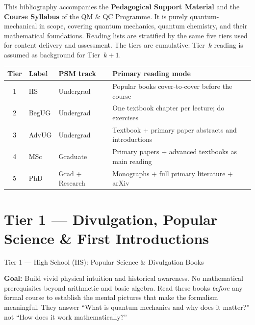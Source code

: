 \documentclass[11pt,a4paper]{article}
\begin{document}
\begin{tcolorbox}[keybox]
This bibliography accompanies the \textbf{Pedagogical Support Material} and the
\textbf{Course Syllabus} of the QM \& QC Programme. It is purely quantum-mechanical
in scope, covering quantum mechanics, quantum chemistry, and their mathematical
foundations. Reading lists are stratified by the same five tiers used for content
delivery and assessment. The tiers are cumulative: Tier~$k$ reading is assumed as
background for Tier~$k+1$.
\end{tcolorbox}

\begin{center}
\begin{tabular}{clp{3.2cm}p{6cm}}
\toprule
\textbf{Tier} & \textbf{Label} & \textbf{PSM track} & \textbf{Primary reading mode}\\
\midrule
1 & HS       & Undergrad & Popular books cover-to-cover before the course\\
2 & BegUG    & Undergrad & One textbook chapter per lecture; do exercises\\
3 & AdvUG    & Undergrad & Textbook + primary paper abstracts and introductions\\
4 & MSc      & Graduate  & Primary papers + advanced textbooks as main reading\\
5 & PhD      & Grad + Research & Monographs + full primary literature + arXiv\\
\bottomrule
\end{tabular}
\end{center}

\newpage

\section{Tier 1 --- Divulgation, Popular Science \& First Introductions}
\label{sec:t1}

\begin{tcolorbox}[tierheader=t1green]
Tier 1 --- High School (HS): Popular Science \& Divulgation Books
\end{tcolorbox}

\medskip
\begin{tcolorbox}[keybox]
\textbf{Goal:} Build vivid physical intuition and historical awareness.
No mathematical prerequisites beyond arithmetic and basic algebra.
Read these books \emph{before} any formal course to establish the mental pictures
that make the formalism meaningful. They answer ``What is quantum mechanics and
why does it matter?'' not ``How does it work mathematically?''
\end{tcolorbox}
\end{document}
